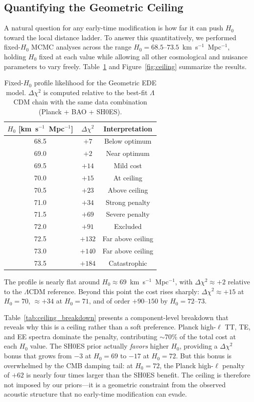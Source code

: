 \documentclass[a4paper,11pt]{article}
\begin{document}
\subsection{Quantifying the Geometric Ceiling}
\label{sec:ceiling_quantitative}

A natural question for any early-time modification is how far it can push $H_0$ toward the local distance ladder. To answer this quantitatively, we performed fixed-$H_0$ MCMC analyses across the range $H_0 = 68.5$--$73.5$~km~s$^{-1}$~Mpc$^{-1}$, holding $H_0$ fixed at each value while allowing all other cosmological and nuisance parameters to vary freely. Table~\ref{tab:h0_ceiling} and Figure~\ref{fig:ceiling} summarize the results.

\begin{table}[ht]
\centering
\caption{Fixed-$H_0$ profile likelihood for the Geometric EDE model. $\Delta\chi^2$ is computed relative to the best-fit $\Lambda$CDM chain with the same data combination (Planck + BAO + SH0ES).}
\label{tab:h0_ceiling}
\begin{tabular}{ccc}
\toprule
$H_0$ [km~s$^{-1}$~Mpc$^{-1}$] & $\Delta\chi^2$ & Interpretation \\
\midrule
68.5 & $+7$ & Below optimum \\
69.0 & $+2$ & Near optimum \\
69.5 & $+14$ & Mild cost \\
70.0 & $+15$ & At ceiling \\
70.5 & $+23$ & Above ceiling \\
71.0 & $+34$ & Strong penalty \\
71.5 & $+69$ & Severe penalty \\
72.0 & $+91$ & Excluded \\
72.5 & $+132$ & Far above ceiling \\
73.0 & $+140$ & Far above ceiling \\
73.5 & $+184$ & Catastrophic \\
\bottomrule
\end{tabular}
\end{table}

The profile is nearly flat around $H_0 \approx 69$~km~s$^{-1}$~Mpc$^{-1}$, with $\Delta\chi^2 \approx +2$ relative to the $\Lambda$CDM reference. Beyond this point the cost rises sharply: $\Delta\chi^2 \approx +15$ at $H_0 = 70$, $\approx +34$ at $H_0 = 71$, and of order $+90$--$150$ by $H_0 = 72$--$73$. 

Table~\ref{tab:ceiling_breakdown} presents a component-level breakdown that reveals why this is a ceiling rather than a soft preference. Planck high-$\ell$ TT, TE, and EE spectra dominate the penalty, contributing $\sim$70\% of the total cost at each $H_0$ value. The SH0ES prior actually \emph{favors} higher $H_0$, providing a $\Delta\chi^2$ bonus that grows from $-3$ at $H_0 = 69$ to $-17$ at $H_0 = 72$. But this bonus is overwhelmed by the CMB damping tail: at $H_0 = 72$, the Planck high-$\ell$ penalty of $+62$ is nearly four times larger than the SH0ES benefit. The ceiling is therefore not imposed by our priors---it is a geometric constraint from the observed acoustic structure that no early-time modification can evade.
\end{document}
